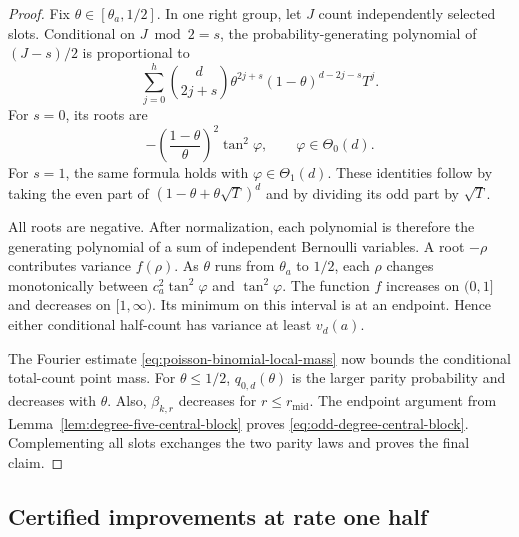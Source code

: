\begin{proof}
Fix $\theta\in[\theta_a,1/2]$.  In one right group, let $J$ count independently
selected slots.  Conditional on $J\bmod2=s$, the probability-generating
polynomial of $(J-s)/2$ is proportional to
\begin{equation*}
 \sum_{j=0}^{h}\binom{d}{2j+s}
 \theta^{2j+s}(1-\theta)^{d-2j-s}T^j.
\end{equation*}
For $s=0$, its roots are
\begin{equation*}
 -\left(\frac{1-\theta}{\theta}\right)^2\tan^2\varphi,
 \qquad \varphi\in\Theta_0(d).
\end{equation*}
For $s=1$, the same formula holds with $\varphi\in\Theta_1(d)$.  These
identities follow by taking the even part of
$(1-\theta+\theta\sqrt T)^d$ and by
dividing its odd part by $\sqrt T$.

All roots are negative.  After normalization, each polynomial is therefore
the generating polynomial of a sum of independent Bernoulli variables.  A
root $-\rho$ contributes variance $f(\rho)$.  As $\theta$ runs from
$\theta_a$ to
$1/2$, each $\rho$ changes monotonically between
$c_a^2\tan^2\varphi$ and $\tan^2\varphi$.  The function $f$ increases on
$(0,1]$ and decreases on $[1,\infty)$.  Its minimum on this interval is at
an endpoint.  Hence either conditional half-count has variance at least
$v_d(a)$.

The Fourier estimate \eqref{eq:poisson-binomial-local-mass} now bounds the
conditional total-count point mass.  For $\theta\leq1/2$,
$q_{0,d}(\theta)$ is the larger parity probability and decreases with
$\theta$.  Also, $\beta_{k,r}$ decreases for
$r\leq r_{\mathrm{mid}}$.  The endpoint argument
from Lemma~\ref{lem:degree-five-central-block} proves
\eqref{eq:odd-degree-central-block}.  Complementing all slots exchanges the
two parity laws and proves the final claim.
\end{proof}

\subsection{Certified improvements at rate one half}

